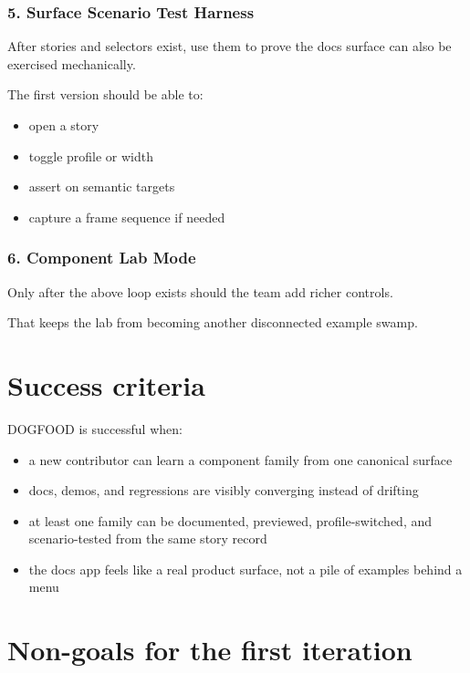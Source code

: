 \subsubsection{5. Surface Scenario Test Harness}\label{record-042-surface-scenario-test-harness-1}

After stories and selectors exist, use them to prove the docs surface can also be exercised mechanically.

The first version should be able to:

\begin{itemize}
\tightlist
\item
  open a story
\item
  toggle profile or width
\item
  assert on semantic targets
\item
  capture a frame sequence if needed
\end{itemize}

\subsubsection{6. Component Lab Mode}\label{record-042-component-lab-mode-1}

Only after the above loop exists should the team add richer controls.

That keeps the lab from becoming another disconnected example swamp.

\section{Success criteria}\label{record-042-success-criteria}

DOGFOOD is successful when:

\begin{itemize}
\tightlist
\item
  a new contributor can learn a component family from one canonical surface
\item
  docs, demos, and regressions are visibly converging instead of drifting
\item
  at least one family can be documented, previewed, profile-switched, and scenario-tested from the same story record
\item
  the docs app feels like a real product surface, not a pile of examples behind a menu
\end{itemize}

\section{Non-goals for the first iteration}\label{record-042-non-goals-for-the-first-iteration}

